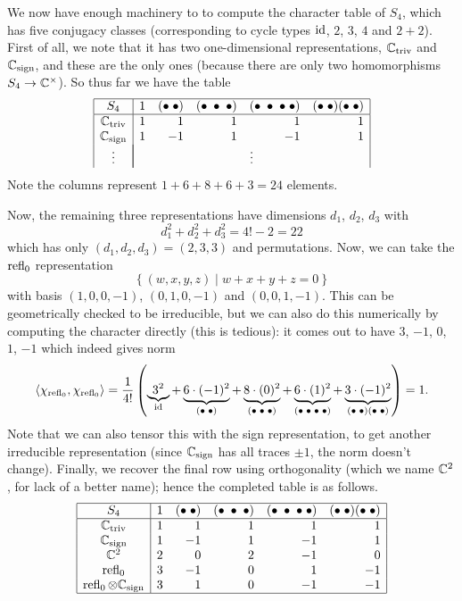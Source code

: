 \begin{example}
	We now have enough machinery to to compute the character
	table of $S_4$, which has five conjugacy classes
	(corresponding to cycle types $\mathrm{id}$, $2$, $3$, $4$ and $2+2$).
	First of all, we note that it has two one-dimensional representations,
	$\mathbb C_{\mathrm{triv}}$ and $\mathbb C_{\mathrm{sign}}$, and these are the only ones
	(because there are only two homomorphisms $S_4 \to \mathbb C^\times$).
	So thus far we have the table
	\[
		\begin{array}{|c|rrrrr|}
			\hline
			S_4 & 1 & (\bullet\;\bullet) & (\bullet\;\bullet\;\bullet)
				& (\bullet\;\bullet\;\bullet\;\bullet)
				& (\bullet\;\bullet)(\bullet\;\bullet)
				\\ \hline
			\Ctriv & 1 & 1 & 1 & 1 & 1 \\
			\Csign & 1 & -1 & 1 & -1 & 1 \\ 
			\vdots & \multicolumn{5}{|c|}{\vdots}
		\end{array}
	\]
	Note the columns represent $1+6+8+6+3=24$ elements.

	Now, the remaining three representations have dimensions
	$d_1$, $d_2$, $d_3$ with
	\[ d_1^2 + d_2^2 + d_3^2 = 4! - 2 = 22 \]
	which has only $(d_1, d_2, d_3) = (2,3,3)$ and permutations.
	Now, we can take the $\operatorname{refl}_0$ representation
	\[ \left\{ (w,x,y,z) \mid w+x+y+z=0 \right\} \]
	with basis $(1,0,0,-1)$, $(0,1,0,-1)$ and $(0,0,1,-1)$.
	This can be geometrically checked to be irreducible,
	but we can also do this numerically by computing the
	character directly (this is tedious):
	it comes out to have $3$, $-1$, $0$, $1$, $-1$
	which indeed gives norm
	\[
		\left< \chi_{\operatorname{refl}_0}, \chi_{\operatorname{refl}_0} \right>
		=
		\frac{1}{4!}
		\left( 
			\underbrace{3^2}_{\mathrm{id}}
			+ \underbrace{6\cdot(-1)^2}_{(\bullet\;\bullet)}
			+ \underbrace{8\cdot(0)^2}_{(\bullet\;\bullet\;\bullet)}
			+ \underbrace{6\cdot(1)^2}_{(\bullet\;\bullet\;\bullet\;\bullet)}
			+ \underbrace{3\cdot(-1)^2}_{(\bullet\;\bullet)(\bullet\;\bullet)}
		\right)
		= 1.
	\]
	Note that we can also tensor this with the sign representation,
	to get another irreducible representation
	(since $\mathbb C_{\mathrm{sign}}$ has all traces $\pm 1$, the norm doesn't change).
	Finally, we recover the final row using orthogonality
	(which we name $\mathbb C^2$, for lack of a better name);
	hence the completed table is as follows.
	\[
		\begin{array}{|c|rrrrr|}
			\hline
			S_4 & 1 & (\bullet\;\bullet) & (\bullet\;\bullet\;\bullet)
				& (\bullet\;\bullet\;\bullet\;\bullet)
				& (\bullet\;\bullet)(\bullet\;\bullet)
				\\ \hline
			\mathbb C_{\mathrm{triv}} & 1 & 1 & 1 & 1 & 1 \\
			\mathbb C_{\mathrm{sign}} & 1 & -1 & 1 & -1 & 1 \\ 
			\mathbb C^2 & 2 & 0 & 2 & -1 & 0 \\ 
			\operatorname{refl}_0 & 3 & -1 & 0 & 1 & -1 \\
			\operatorname{refl}_0 \otimes \mathbb C_{\mathrm{sign}} & 3 & 1 & 0 & -1 & -1 \\\hline
		\end{array}
	\]
\end{example}

